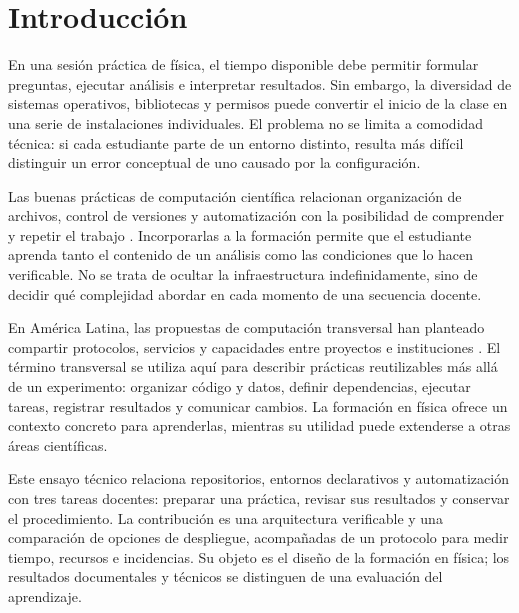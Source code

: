 \section{Introducción}
En una sesión práctica de física, el tiempo disponible debe permitir formular preguntas, ejecutar análisis e interpretar resultados. Sin embargo, la diversidad de sistemas operativos, bibliotecas y permisos puede convertir el inicio de la clase en una serie de instalaciones individuales. El problema no se limita a comodidad técnica: si cada estudiante parte de un entorno distinto, resulta más difícil distinguir un error conceptual de uno causado por la configuración.

Las buenas prácticas de computación científica relacionan organización de archivos, control de versiones y automatización con la posibilidad de comprender y repetir el trabajo \cite{wilson}. Incorporarlas a la formación permite que el estudiante aprenda tanto el contenido de un análisis como las condiciones que lo hacen verificable. No se trata de ocultar la infraestructura indefinidamente, sino de decidir qué complejidad abordar en cada momento de una secuencia docente.

En América Latina, las propuestas de computación transversal han planteado compartir protocolos, servicios y capacidades entre proyectos e instituciones \cite{transversal,whitepaper}. El término transversal se utiliza aquí para describir prácticas reutilizables más allá de un experimento: organizar código y datos, definir dependencias, ejecutar tareas, registrar resultados y comunicar cambios. La formación en física ofrece un contexto concreto para aprenderlas, mientras su utilidad puede extenderse a otras áreas científicas.

Este ensayo técnico relaciona repositorios, entornos declarativos y automatización con tres tareas docentes: preparar una práctica, revisar sus resultados y conservar el procedimiento. La contribución es una arquitectura verificable y una comparación de opciones de despliegue, acompañadas de un protocolo para medir tiempo, recursos e incidencias. Su objeto es el diseño de la formación en física; los resultados documentales y técnicos se distinguen de una evaluación del aprendizaje.
